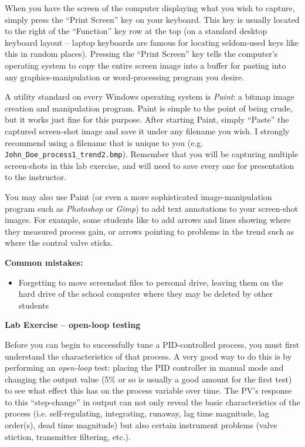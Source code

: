 When you have the screen of the computer displaying what you wish to capture, simply press the ``Print Screen'' key on your keyboard.  This key is usually located to the right of the ``Function'' key row at the top (on a standard desktop keyboard layout -- laptop keyboards are famous for locating seldom-used keys like this in random places).  Pressing the ``Print Screen'' key tells the computer's operating system to copy the entire screen image into a buffer for pasting into any graphics-manipulation or word-processing program you desire.

A utility standard on every Windows operating system is {\it Paint}: a bitmap image creation and manipulation program.  Paint is simple to the point of being crude, but it works just fine for this purpose.  After starting Paint, simply ``Paste'' the captured screen-shot image and save it under any filename you wish.  I strongly recommend using a filename that is unique to you (e.g. {\tt John\_Doe\_process1\_trend2.bmp}).  Remember that you will be capturing multiple screen-shots in this lab exercise, and will need to save every one for presentation to the instructor.  

You may also use Paint (or even a more sophisticated image-manipulation program such as {\it Photoshop} or {\it Gimp}) to add text annotations to your screen-shot images.  For example, some students like to add arrows and lines showing where they measured process gain, or arrows pointing to problems in the trend such as where the control valve sticks.

\vskip 10pt

{\bf Common mistakes:}

\begin{itemize}
\item{} Forgetting to move screenshot files to personal drive, leaving them on the hard drive of the school computer where they may be deleted by other students
\end{itemize}






\vfil \eject

\noindent
{\bf Lab Exercise -- open-loop testing}

\vskip 5pt

Before you can begin to successfully tune a PID-controlled process, you must first understand the characteristics of that process.  A very good way to do this is by performing an {\it open-loop} test: placing the PID controller in manual mode and changing the output value (5\% or so is usually a good amount for the first test) to see what effect this has on the process variable over time.  The PV's response to this ``step-change'' in output can not only reveal the basic characteristics of the process (i.e. self-regulating, integrating, runaway, lag time magnitude, lag order(s), dead time magnitude) but also certain instrument problems (valve stiction, transmitter filtering, etc.).

